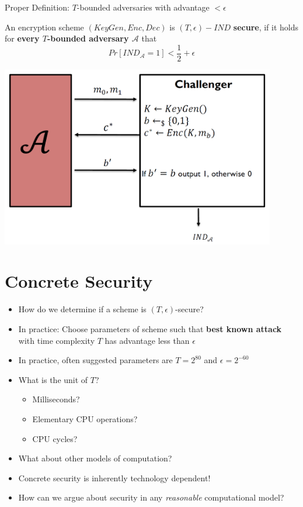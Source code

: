 		Proper Definition: $T$-bounded adversaries with advantage $< \epsilon$
		\begin{definition}
			An encryption scheme $(KeyGen,Enc,Dec)$ is $(T,\epsilon)-IND$ \textbf{secure}, if it holds for \textbf{every $T$-bounded adversary $\mathcal{A}$} that
			$$Pr[IND_{\mathcal{A}} = 1] < \frac{1}{2} + \epsilon$$
		\end{definition}
		\begin{center}
			\includegraphics[width=120mm]{Graphics/Basics of Private Key Encryption/ComputationallySecureEncryption.png}\newline
		\end{center}
	
	\section{Concrete Security}
		\begin{itemize}
			\item How do we determine if a scheme is $(T,\epsilon)$-secure?
			\item In practice: Choose parameters of scheme such that \textbf{best known attack} with time complexity $T$ has advantage less than $\epsilon$
			\item In practice, often suggested parameters are $T = 2^{80}$ and $\epsilon = 2^{-60}$
			\item What is the unit of $T$?
			\begin{itemize}
				\item Milliseconds?
				\item Elementary CPU operations?
				\item CPU cycles?
			\end{itemize}
			\item What about other models of computation?
			\item Concrete security is inherently technology dependent!
			\item How can we argue about security in any \textit{reasonable} computational model?
		\end{itemize}
	
